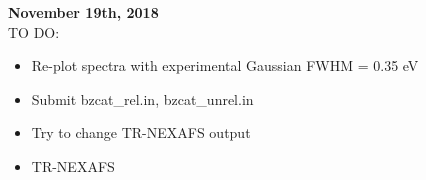 \documentclass{article}
\begin{document}
\textbf{November 19th, 2018 }\\
TO DO:
\begin{itemize}
\item Re-plot spectra with experimental Gaussian FWHM = 0.35 eV
\item Submit bzcat_rel.in, bzcat_unrel.in
\item Try to change TR-NEXAFS output
\item TR-NEXAFS
\end{itemize}
\end{document}
